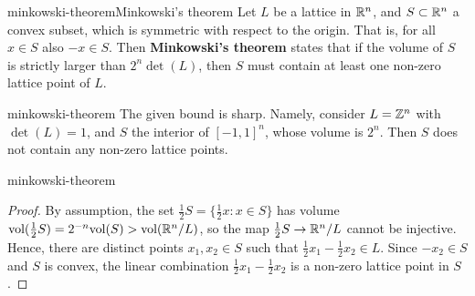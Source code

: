 \begin{topic}{minkowski-theorem}{Minkowski's theorem}
    Let $L$ be a lattice in $\mathbb{R}^n$, and $S \subset \mathbb{R}^n$ a convex subset, which is symmetric with respect to the origin. That is, for all $x \in S$ also $-x \in S$. Then \textbf{Minkowski's theorem} states that if the volume of $S$ is strictly larger than $2^n \det(L)$, then $S$ must contain at least one non-zero lattice point of $L$.
\end{topic}

\begin{example}{minkowski-theorem}
    The given bound is sharp. Namely, consider $L = \mathbb{Z}^n$ with $\det(L) = 1$, and $S$ the interior of $[-1, 1]^n$, whose volume is $2^n$. Then $S$ does not contain any non-zero lattice points.
\end{example}

\begin{example}{minkowski-theorem}
    \begin{proof}
        By assumption, the set $\tfrac{1}{2} S = \{ \tfrac{1}{2} x : x \in S \}$ has volume $\textup{vol}(\tfrac{1}{2} S) = 2^{-n} \textup{vol}(S) > \textup{vol}(\mathbb{R}^n/L)$, so the map $\tfrac{1}{2} S \to \mathbb{R}^n / L$ cannot be injective. Hence, there are distinct points $x_1, x_2 \in S$ such that $\tfrac{1}{2} x_1 - \tfrac{1}{2} x_2 \in L$. Since $-x_2 \in S$ and $S$ is convex, the linear combination $\tfrac{1}{2} x_1 - \tfrac{1}{2} x_2$ is a non-zero lattice point in $S$.
    \end{proof}
\end{example}

